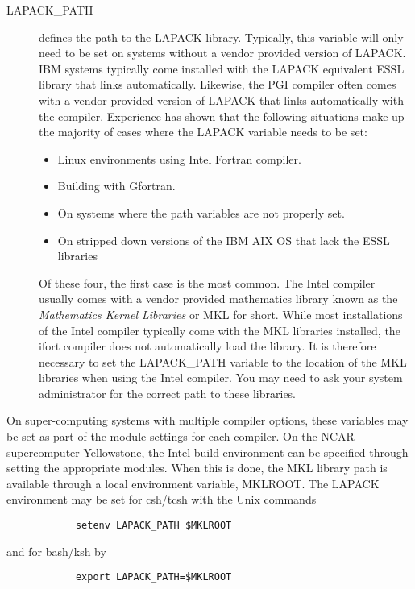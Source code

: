 \begin{description}
\item[LAPACK\_PATH] defines the path to the LAPACK library. Typically, this variable will only need to be set on systems without a vendor provided version of LAPACK.
IBM systems typically come installed with the LAPACK equivalent ESSL library that links automatically. Likewise, the PGI compiler often comes with a vendor provided version of LAPACK that links automatically with the compiler. Experience has shown that the following situations make up the majority of cases where the LAPACK variable needs to be set:
\begin{itemize}
\item Linux environments using Intel Fortran compiler.
\item Building with Gfortran.
\item On systems where the path variables are not properly set.
\item On stripped down versions of the IBM AIX OS that lack the ESSL libraries
\end{itemize}
Of these four, the first case is the most common. The Intel compiler usually comes with a vendor provided mathematics library known as the \textit{Mathematics Kernel Libraries} or MKL for short. While most installations of the Intel compiler typically come with the MKL libraries installed, the ifort compiler does not automatically load the library. It is therefore necessary to set the LAPACK\_PATH variable to the location of the MKL libraries when using the Intel compiler. You may need to ask your system administrator for the correct path to these libraries.
\end{description}

On super-computing systems with multiple compiler options, these variables may be set as part of the module settings for each compiler. On the NCAR supercomputer Yellowstone, the Intel build environment can be specified through setting the appropriate modules. When this is done, the MKL library path is available through a local environment variable, MKLROOT. The LAPACK environment may be set for csh/tcsh with the Unix commands
\begin{small}
\begin{verbatim}
            setenv LAPACK_PATH $MKLROOT
\end{verbatim}
\end{small}
and for bash/ksh by
\begin{small}
\begin{verbatim}
            export LAPACK_PATH=$MKLROOT
\end{verbatim}
\end{small}

